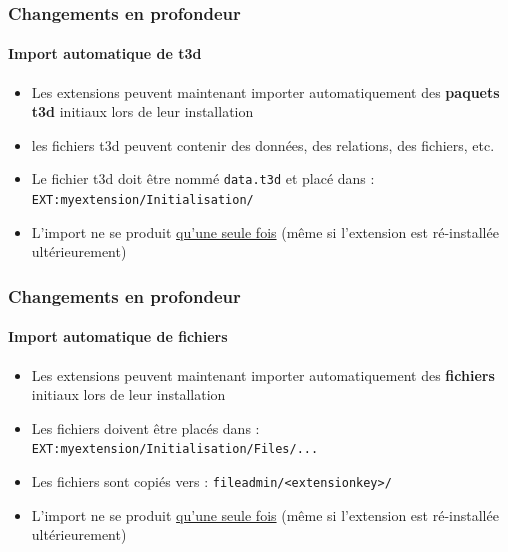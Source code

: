
\begin{frame}[fragile]
	\frametitle{Changements en profondeur}
	\framesubtitle{Import automatique de t3d}

	\begin{itemize}
		\item Les extensions peuvent maintenant importer automatiquement des \textbf{paquets t3d} initiaux lors de leur installation
		\item les fichiers t3d peuvent contenir des données, des relations, des fichiers, etc.
		\item Le fichier t3d doit être nommé \texttt{data.t3d} et placé dans :\newline
			\texttt{EXT:myextension/Initialisation/}

		\item L'import ne se produit \underline{qu'une seule fois}\newline
			(même si l'extension est ré-installée ultérieurement)

	\end{itemize}

\end{frame}


\begin{frame}[fragile]
	\frametitle{Changements en profondeur}
	\framesubtitle{Import automatique de fichiers}

	\begin{itemize}
		\item Les extensions peuvent maintenant importer automatiquement des \textbf{fichiers} initiaux	lors de leur installation
		\item Les fichiers doivent être placés dans :\newline
			\texttt{EXT:myextension/Initialisation/Files/...}
		\item Les fichiers sont copiés vers :\newline
			\texttt{fileadmin/<extensionkey>/}
		\item L'import ne se produit \underline{qu'une seule fois}\newline
			(même si l'extension est ré-installée ultérieurement)

	\end{itemize}

\end{frame}

